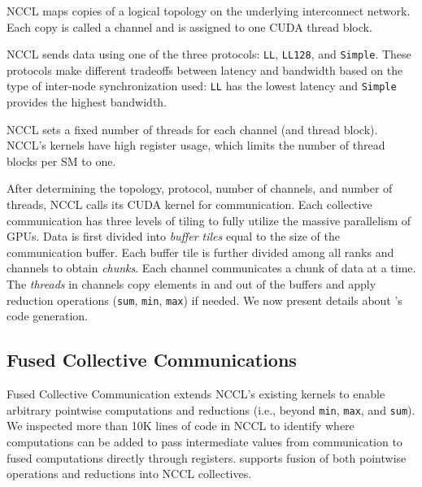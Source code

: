NCCL maps copies of a logical topology on the underlying interconnect network.
Each copy is called a channel and is assigned to one CUDA thread block.

NCCL sends data using one of the three protocols: \texttt{LL}, \texttt{LL128}, and \texttt{Simple}.
These protocols make different tradeoffs between latency and bandwidth based on the type of inter-node synchronization used: 
\texttt{LL} has the lowest latency and \texttt{Simple} provides the highest bandwidth.


NCCL sets a fixed number of threads for each channel (and thread block).
NCCL's kernels have high register usage, which limits the number of thread blocks per SM to one.

After determining the topology, protocol, number of channels, and 
number of threads, NCCL calls its CUDA kernel for communication.
Each collective communication has three levels of tiling to fully utilize the massive parallelism of GPUs.
Data is first divided into \emph{buffer tiles} equal to the size of the communication buffer.
Each buffer tile is further divided among all ranks and channels to obtain \emph{chunks}.
Each channel communicates a chunk of data at a time.
The \emph{threads} in channels copy elements in and out of the buffers and
apply reduction operations (\texttt{sum}, \texttt{min}, \texttt{max}) if needed.
We now present details about \tool's code generation.

\subsection{Fused Collective Communications}
\label{sec:code-gen-fused}
Fused Collective Communication extends NCCL's existing kernels to enable arbitrary pointwise computations and reductions (i.e., beyond \texttt{min}, \texttt{max}, and \texttt{sum}).
We inspected more than 10K lines of code in NCCL to identify where computations can be added to pass intermediate values from communication to fused computations directly through registers.
\tool supports fusion of both pointwise operations and reductions into NCCL collectives.


